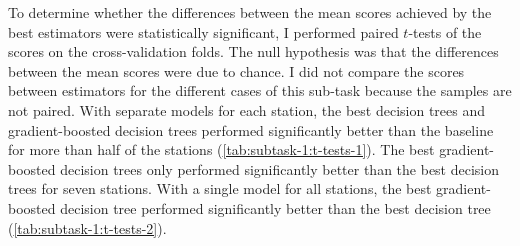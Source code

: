 \documentclass[11pt]{extarticle}
\begin{document}
To determine whether the differences between the mean scores achieved by the best
estimators were statistically significant, I performed paired $t$-tests of the scores
on the cross-validation folds.
The null hypothesis was that the differences between the mean scores were due to
chance.
I did not compare the scores between estimators for the different cases of this
sub-task because the samples are not paired.
With separate models for each station, the best decision trees and gradient-boosted
decision trees performed significantly better than the baseline for more than half of
the stations (\cref{tab:subtask-1:t-tests-1}).
The best gradient-boosted decision trees only performed significantly better than the
best decision trees for seven stations.
With a single model for all stations, the best gradient-boosted decision tree performed
significantly better than the best decision tree (\cref{tab:subtask-1:t-tests-2}).
\end{document}
